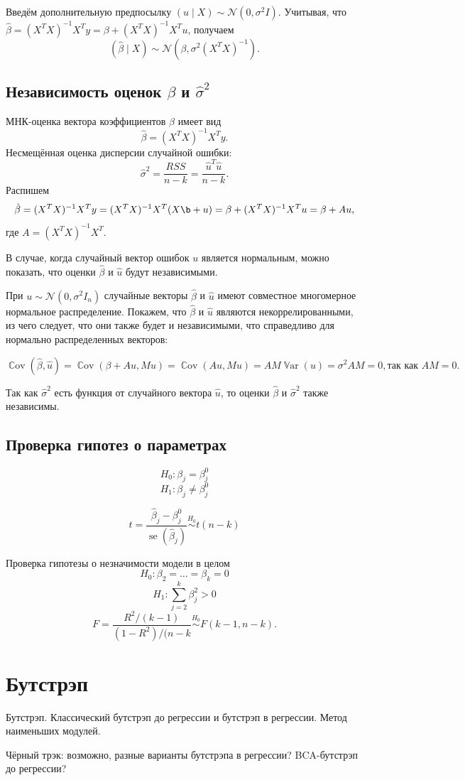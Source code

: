 \documentclass[12pt]{article}
\DeclareMathOperator{\Cov}{\mathbb{C}ov}
\DeclareMathOperator{\Var}{\mathbb{V}ar}
\DeclareMathOperator{\se}{se}
\newcommand{\cN}{\mathcal{N}}
\newcommand{\hb}{\hat{\beta}}
\newcommand{\hu}{\hat{u}}
\newcommand{\hs}{\hat{\sigma}}
\newcommand{\RSS}{RSS}
\begin{document}
Введём дополнительную предпосылку $(u \mid X) \sim \cN(0, \sigma^2 I)$.
Учитывая, что $\hb = (X^T X)^{-1}X^T y = \beta + (X^T X)^{-1}X^T u$, получаем
\[
(\hb \mid X) \sim \cN(\beta, \sigma^2(X^T X)^{-1}).
\]

\subsection{Независимость оценок $\beta$ и $\hs^2$}
МНК-оценка вектора коэффициентов $\beta$ имеет вид
\[
\hb = (X^TX)^{-1}X^{T}y.
\]
Несмещённая оценка дисперсии случайной ошибки:
\[
\hs^2 = \frac{\RSS}{n-k} = \frac{\hu^T \hu}{n-k}.
\]
Распишем
\[
\hb = (X^TX)^{-1}X^{T}y = (X^TX)^{-1}X^{T}(X\b+u) = \beta + (X^TX)^{-1}X^{T}u = \beta + Au,
\]
где $A = (X^TX)^{-1}X^{T}$.

В случае, когда случайный вектор ошибок $u$ является нормальным, можно показать, что оценки $\hb$ и $\hu$ будут независимыми.

При $u \sim \cN(0,\sigma^2I_n)$ случайные векторы $\hb$ и $\hu$ имеют совместное многомерное нормальное распределение. Покажем, что  $\hb$ и $\hu$ являются некоррелированными, из чего следует, что они также будет и независимыми, что справедливо для нормально распределенных векторов:

\[
\Cov(\hb,\hu) = \Cov(\beta + Au, Mu) = \Cov(Au,Mu) = AM\Var(u) = \sigma^2AM = 0, \textbf{так как } AM=0.
\]

Так как $\hat\sigma^2$ есть функция от случайного вектора $\hu$, то оценки $\hb$ и $\hat\sigma^2$ также независимы.

\subsection{Проверка гипотез о параметрах}
\[
H_0: \beta_j = \beta_j^0
\]
\[
H_1: \beta_j \neq \beta_j^0
\]

\[
t = \frac{\hb_j - \beta_j^0}{\se(\hb_j)} \overset{H_0}{\sim} t(n-k)
\]

Проверка гипотезы о незначимости модели в целом
\[
H_0: \beta_2 = \dots =\beta_k = 0
\]
\[
H_1: \sum_{j=2}^k \beta_j^2 > 0
\]
\[
F = \frac{R^2 / (k-1)}{(1 - R^2)/(n-k} \overset{H_0}{\sim} F(k-1,n-k).
\]
\section{Бутстрэп}
Бутстрэп. Классический бутстрэп до регрессии и бутстрэп в регрессии. Метод наименьших модулей.

Чёрный трэк: возможно, разные варианты бутстрэпа в регрессии? BCA-бутстрэп до регрессии?
\end{document}
